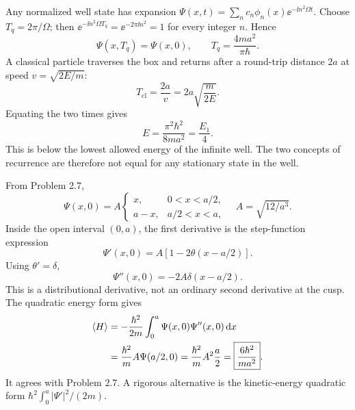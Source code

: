 Any normalized well state has expansion
$\Psi(x,t)=\sum_n c_n\phi_n(x)
\ee^{-\ii n^2\Omega t}$.
Choose $T_q=2\pi/\Omega$; then
$\ee^{-\ii n^2\Omega T_q}=\ee^{-2\pi\ii n^2}=1$
for every integer $n$. Hence
\begin{equation}
\boxed{\Psi(x,T_q)=\Psi(x,0)},\qquad
\boxed{T_q=\frac{4ma^2}{\pi\hbar}}.
\end{equation}
A classical particle traverses the box and returns
after a round-trip distance $2a$ at speed
$v=\sqrt{2E/m}$:
\begin{equation}
\boxed{T_{\mathrm{cl}}=\frac{2a}{v}
=2a\sqrt{\frac{m}{2E}}}.
\end{equation}
Equating the two times gives
\begin{equation}
\boxed{E=\frac{\pi^2\hbar^2}{8ma^2}=\frac{E_1}{4}}.
\end{equation}
This is below the lowest allowed energy of the
infinite well. The two concepts of recurrence
are therefore not equal for any stationary
state in the well.

From Problem 2.7,
\begin{equation}
\Psi(x,0)=A
\begin{cases}x,&0<x<a/2,\\a-x,&a/2<x<a,\end{cases}
\quad A=\sqrt{12/a^3}.
\end{equation}
Inside the open interval $(0,a)$, the first
derivative is the step-function expression
\begin{equation}
\boxed{\Psi'(x,0)=A[1-2\theta(x-a/2)]}.
\end{equation}
Using $\theta'=\delta$,
\begin{equation}
\boxed{\Psi''(x,0)=-2A\delta(x-a/2)}.
\end{equation}
This is a distributional derivative, not an ordinary
second derivative at the cusp. The quadratic energy
form gives
\begin{align}
\left\langle H\right\rangle&=-\frac{\hbar^2}{2m}\int_0^a
\Psi(x,0)\Psi''(x,0)\,\mathrm d x\\
&=\frac{\hbar^2}{m}A\Psi(a/2,0)
=\frac{\hbar^2}{m}A^2\frac a2
=\boxed{\frac{6\hbar^2}{ma^2}}.
\end{align}
It agrees with Problem 2.7. A rigorous
alternative is the kinetic-energy quadratic form
$\hbar^2\int_0^a|\Psi'|^2/(2m)$.

